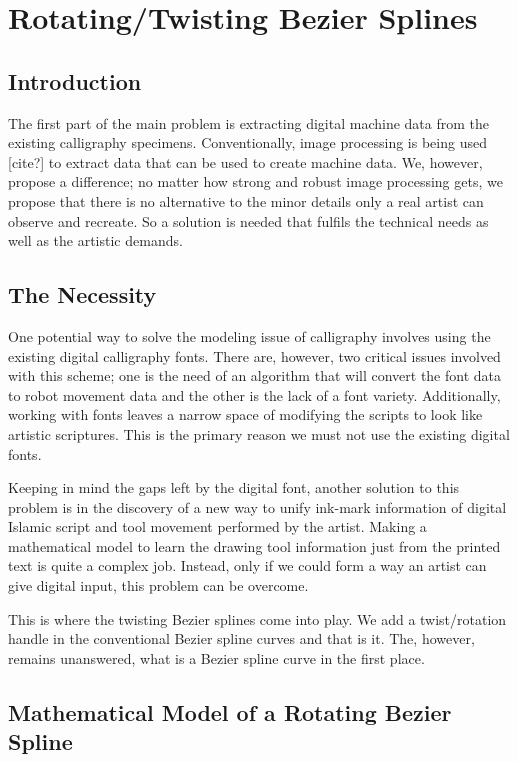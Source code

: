 \section{Rotating/Twisting Bezier Splines}

    \subsection{Introduction}
    The first part of the main problem is extracting digital machine data from the existing calligraphy specimens.  Conventionally, image processing is being used [cite?] to extract data that can be used to create machine data. We, however, propose a difference; no matter how strong and robust image processing gets, we propose that there is no alternative to the minor details only a real artist can observe and recreate. So a solution is needed that fulfils the technical needs as well as the artistic demands.

    \subsection{The Necessity}
    One potential way to solve the modeling issue of calligraphy involves using the existing digital calligraphy fonts. There are, however, two critical issues involved with this scheme; one is the need of an algorithm that will convert the font data to robot movement data and the other is the lack of a font variety. Additionally, working with fonts leaves a narrow space of modifying the scripts to look like artistic scriptures. This is the primary reason we must not use the existing digital fonts.
    
    Keeping in mind the gaps left by the digital font, another solution to this problem is in the discovery of a new way to unify ink-mark information of digital Islamic script and tool movement performed by the artist. Making a mathematical model to learn the drawing tool information just from the printed text is quite a complex job. Instead, only if we could form a way an artist can give digital input, this problem can be overcome.

    This is where the twisting Bezier splines come into play. We add a twist/rotation handle in the conventional Bezier spline curves and that is it. The, however, remains unanswered, what is a Bezier spline curve in the first place.

    \subsection{Mathematical Model of a Rotating Bezier Spline}
